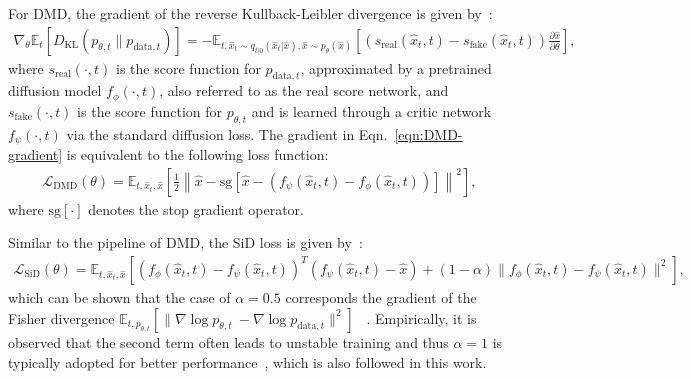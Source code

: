For DMD, the gradient of the reverse Kullback-Leibler divergence is given by~\cite{yin2024one, wang2023prolificdreamer, luo2023diffinstruct}:
\begin{align}
\label{eqn:DMD-gradient}
    \nabla_\theta  \mathbb E_{t}[D_\text{KL}(p_{\theta, t} \| p_{\text{data}, t})] = -\mathbb E_{t, \hat x_t \sim q_{t|0}(\hat x_t | \hat x), \hat x \sim p_\theta(\hat x)} \left[ (s_{\text{real}}(\hat x_t, t) - s_{\text{fake}}(\hat x_t, t))\frac{\partial \hat x}{\partial \theta}\right],
\end{align}
where $s_\text{real}(\cdot, t)$ is the score function for $p_{\text{data}, t}$, approximated by a pretrained diffusion model $f_\phi(\cdot, t)$, also referred to as the real score network, and $s_{\text{fake}}(\cdot, t)$ is the score function for $p_{\theta, t}$ and is learned through a critic network $f_\psi(\cdot, t)$ via the standard diffusion loss. The gradient in Eqn.~\eqref{eqn:DMD-gradient} is equivalent to the following loss function:
\begin{align}
    \mathcal L_{\text{DMD}}(\theta) = \mathbb E_{t, \hat x_t, \hat x}\left[ \frac{1}{2}\left\| \hat x - \mathrm{sg}\left[\hat x  - (f_\psi(\hat x_t, t) - f_\phi(\hat x_t, t))\right]\right\|^2\right],
\end{align}
where $\mathrm{sg}[\cdot]$ denotes the stop gradient operator.


Similar to the pipeline of DMD, the SiD loss is given by~\cite{zhou2024score}:
\begin{align}
    \mathcal L_{\text{SiD}}(\theta) = \mathbb E_{t, \hat x_t, \hat x}\left[ (f_\phi(\hat x_t, t) - f_\psi(\hat x_t, t))^T (f_\psi(\hat x_t, t) - \hat x) + (1 - \alpha) \| f_{\phi}(\hat x_t , t) - f_\psi(\hat x_t, t)\|^2 \right],
\end{align}
which can be shown that the case of $\alpha = 0.5$ corresponds the gradient of the Fisher divergence $\mathbb E_{t, p_{\theta, t}}[\| \nabla \log p_{\theta, t}\ - \nabla \log p_{\text{data}, t}\|^2]$ ~\cite{luo2024one, huang2024flow}. Empirically, it is observed that the second term often leads to unstable training and thus $\alpha=1$ is typically adopted for better performance~\cite{zhou2024score, zhou2025adversarial}, which is also followed in this work.




